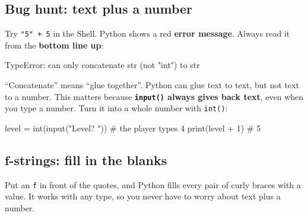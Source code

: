 \subsection{Bug hunt: text plus a number}
Try \texttt{"5" + 5} in the Shell. Python shows a red \textbf{error message}. Always read it from the \textbf{bottom line up}:
\begin{outputcode}
TypeError: can only concatenate str (not "int") to str
\end{outputcode}
\enquote{Concatenate} means \enquote{glue together}. Python can glue text to text, but not text to a number.
This matters because \textbf{\texttt{input()} always gives back text}, even when you type a number. Turn it into a whole number with \texttt{int()}:
\begin{pycode}
level = int(input("Level? "))     # the player types 4
print(level + 1)                  # 5
\end{pycode}

\subsection{f-strings: fill in the blanks}
Put an \texttt{f} in front of the quotes, and Python fills every pair of curly braces with a value.
It works with any type, so you never have to worry about text plus a number.

\begin{center}
\end{center}

